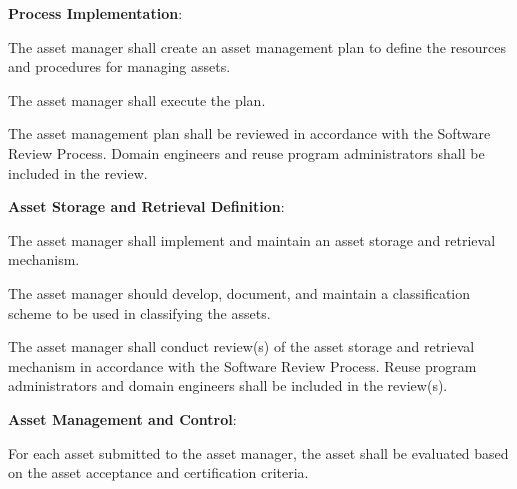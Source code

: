 			\begin{adjustwidth}{2em}{0pt} 

				\begin{compactenum}

					\item {\bf Process Implementation}:

					\begin{compactenum}

						\item The asset manager shall create an asset management plan to define the resources and procedures for managing assets.

						\item The asset manager shall execute the plan.

						\item The asset management plan shall be reviewed in accordance with the Software Review Process. Domain engineers and reuse program administrators shall be included in the review.

					\end{compactenum}

					\item {\bf Asset Storage and Retrieval Definition}:

					\begin{compactenum}

						\item The asset manager shall implement and maintain an asset storage and retrieval mechanism.

						\item The asset manager should develop, document, and maintain a classification scheme to be used in classifying the assets.

						\item The asset manager shall conduct review(s) of the asset storage and retrieval mechanism in accordance with the Software Review Process. Reuse program administrators and domain engineers shall be included in the review(s).

					\end{compactenum}

					\item {\bf Asset Management and Control}:

					\begin{compactenum}

						\item For each asset submitted to the asset manager, the asset shall be evaluated based on the asset acceptance and certification criteria.


\end{compactenum}
\end{compactenum}
\end{adjustwidth}
